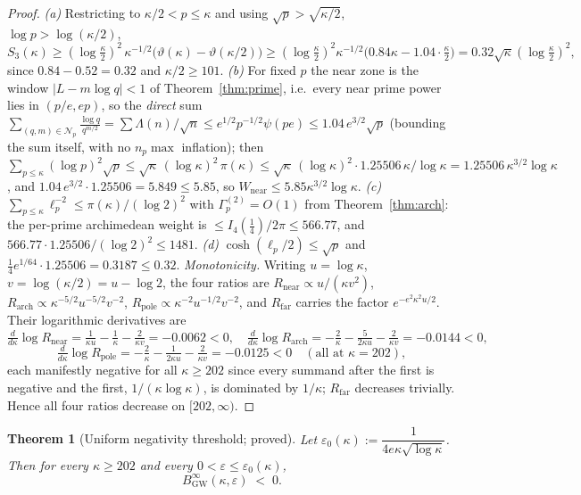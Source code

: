 \documentclass[11pt]{article}
\newtheorem{theorem}{Theorem}[section]
\newcommand{\BinfGW}{B_{\mathrm{GW}}^{\infty}}   %
\newcommand{\Gp}{\Gamma_p^{(2)}}            %
\begin{document}
\begin{proof}
\emph{(a)} Restricting to $\kappa/2<p\le\kappa$ and using
$\sqrt p>\sqrt{\kappa/2}$, $\log p>\log(\kappa/2)$,
\[
S_3(\kappa)\ge(\log\tfrac\kappa2)^2\,\kappa^{-1/2}\bigl(\vartheta(\kappa)-\vartheta(\kappa/2)\bigr)
\ge(\log\tfrac\kappa2)^2\kappa^{-1/2}\bigl(0.84\kappa-1.04\cdot\tfrac\kappa2\bigr)
=0.32\sqrt\kappa(\log\tfrac\kappa2)^2,
\]
since $0.84-0.52=0.32$ and $\kappa/2\ge101$.
\emph{(b)} For fixed $p$ the near zone is the window $|L-m\log q|<1$ of
Theorem~\ref{thm:prime}, i.e.\ every near prime power lies in $(p/e,ep)$, so
the \emph{direct} sum $\sum_{(q,m)\in\mathcal N_p}\tfrac{\log q}{q^{m/2}}
=\sum\Lambda(n)/\sqrt n\le e^{1/2}p^{-1/2}\psi(pe)\le1.04\,e^{3/2}\sqrt p$
(bounding the sum itself, with no $n_p\max$ inflation);
then $\sum_{p\le\kappa}(\log p)^2\sqrt p\le\sqrt\kappa\,(\log\kappa)^2\,\pi(\kappa)
\le\sqrt\kappa\,(\log\kappa)^2\cdot1.25506\,\kappa/\log\kappa
=1.25506\,\kappa^{3/2}\log\kappa$,
and $1.04\,e^{3/2}\cdot1.25506=5.849\le5.85$, so $W_{\mathrm{near}}\le5.85\kappa^{3/2}\log\kappa$.
\emph{(c)} $\sum_{p\le\kappa}\ell_p^{-2}\le\pi(\kappa)/(\log2)^2$ with
$\Gp=O(1)$ from Theorem~\ref{thm:arch}: the per-prime archimedean weight is
$\le I_4(\tfrac14)/2\pi\le 566.77$, and
$566.77\cdot1.25506/(\log2)^2\le1481$.
\emph{(d)} $\cosh(\ell_p/2)\le\sqrt p$ and
$\tfrac14e^{1/64}\cdot1.25506=0.3187\le0.32$.
\emph{Monotonicity.} Writing $u=\log\kappa$, $v=\log(\kappa/2)=u-\log2$, the
four ratios are $R_{\mathrm{near}}\!\propto u/(\kappa v^2)$,
$R_{\mathrm{arch}}\!\propto\kappa^{-5/2}u^{-5/2}v^{-2}$,
$R_{\mathrm{pole}}\!\propto\kappa^{-2}u^{-1/2}v^{-2}$, and
$R_{\mathrm{far}}$ carries the factor $e^{-e^2\kappa^2u/2}$.
Their logarithmic derivatives are
\[
\tfrac{d}{d\kappa}\log R_{\mathrm{near}}=\tfrac1{\kappa u}-\tfrac1\kappa-\tfrac2{\kappa v}
=-0.0062<0,\quad
\tfrac{d}{d\kappa}\log R_{\mathrm{arch}}=-\tfrac2\kappa-\tfrac5{2\kappa u}-\tfrac2{\kappa v}
=-0.0144<0,
\]
\[
\tfrac{d}{d\kappa}\log R_{\mathrm{pole}}=-\tfrac2\kappa-\tfrac1{2\kappa u}-\tfrac2{\kappa v}
=-0.0125<0\quad(\text{all at }\kappa=202),
\]
each manifestly negative for all $\kappa\ge202$ since every summand after the
first is negative and the first, $1/(\kappa\log\kappa)$, is dominated by
$1/\kappa$; $R_{\mathrm{far}}$ decreases trivially. Hence all four ratios
decrease on $[202,\infty)$.
\end{proof}


\begin{theorem}[Uniform negativity threshold; proved]
\label{thm:uniform}
Let $\varepsilon_0(\kappa):=\dfrac{1}{4e\kappa\sqrt{\log\kappa}}$.
Then for every $\kappa\ge 202$ and every $0<\varepsilon\le\varepsilon_0(\kappa)$,
\[
\BinfGW(\kappa,\varepsilon)\;<\;0 .
\]
\end{theorem}
\end{document}
